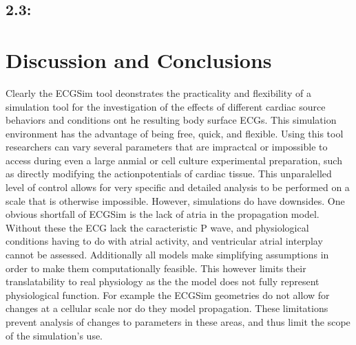 \documentclass[12pt]{article}
\begin{document}
\subsection{2.3: }


\section{Discussion and Conclusions}


Clearly the ECGSim tool deonstrates the practicality and flexibility of a simulation tool for the investigation of the effects of different cardiac source behaviors and conditions ont he resulting body surface ECGs. This simulation environment has the advantage of being free, quick, and flexible. Using this tool researchers can vary several parameters that are impractcal or impossible to access during even a large anmial or cell culture experimental preparation, such as directly modifying the actionpotentials of cardiac tissue. This unparalelled level of control allows for very specific and detailed analysis to be performed on a scale that is otherwise impossible. However, simulations do have downsides. One obvious shortfall of ECGSim is the lack of atria in the propagation model. Without these the ECG lack the caracteristic P wave, and physiological conditions having to do with atrial activity, and ventricular atrial interplay cannot be assessed.  Additionally all models make simplifying assumptions in order to make them computationally feasible. This however limits their translatability to real physiology as the the model does not fully represent physiological function. For example the ECGSim geometries do not allow for changes at a cellular scale nor do they model propagation. These limitations prevent analysis of changes to parameters in these areas, and thus limit the scope of the simulation's use. 


%
%
\end{document}
